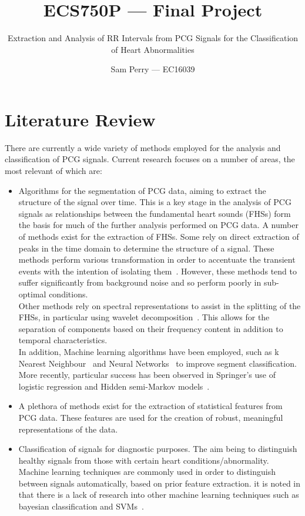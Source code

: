 \documentclass[titlepage]{scrartcl}
\begin{document}
\title{ECS750P --- Final Project}
\subtitle{\LARGE{Extraction and Analysis of RR Intervals from PCG Signals for the
Classification of Heart Abnormalities}}
\author{Sam Perry --- EC16039}

\maketitle

\section{Literature Review}
There are currently a wide variety of methods employed for the analysis and
classification of PCG signals. Current research focuses on a number of areas,
the most relevant of which are:
\begin{itemize}
    \item Algorithms for the segmentation of PCG data, aiming to extract the
        structure of the signal over time. This is a key stage in the analysis
        of PCG signals as relationships between the fundamental heart sounds
        (FHSs) form the basis for much of the further analysis performed on PCG
        data. A number of methods exist for the extraction of FHSs. Some rely
        on direct extraction of peaks in the time domain to determine the
        structure of a signal. These methods perform various transformation in
        order to accentuate the transient events with the intention of
        isolating them~\parencite{Groch1992, Liang1997}. However, these methods
        tend to suffer significantly from background noise and so perform
        poorly in sub-optimal conditions.\\
        Other methods rely on spectral representations to assist in the
        splitting of the FHSs, in particular using wavelet
        decomposition~\parencite{LiangHuiying1997, Vepa2008}. This allows for
        the separation of components based on their frequency content in
        addition to temporal characteristics.\\
        In addition,  Machine learning algorithms have been employed, such as k
        Nearest Neighbour~\parencite{Gupta2007} and Neural
        Networks~\parencite{Oskiper2002} to improve segment classification.
        More recently, particular success has been observed in Springer's use
        of logistic regression and Hidden semi-Markov
        models~\citeyearpar{Springer2016}.
    \item A plethora of methods exist for the extraction of statistical
        features from PCG data. These features are used for the creation of
        robust, meaningful representations of the data.
    \item Classification of signals for diagnostic purposes. The aim being to
        distinguish healthy signals from those with certain heart
        conditions/abnormality. Machine learning techniques are commonly used
        in order to distinguish between signals automatically, based on prior
        feature extraction. 
        it is noted in  that there is a lack of research into other machine
        learning techniques such as bayesian classification and
        SVMs~\citeyearpar{}.
\end{itemize}
\end{document}
